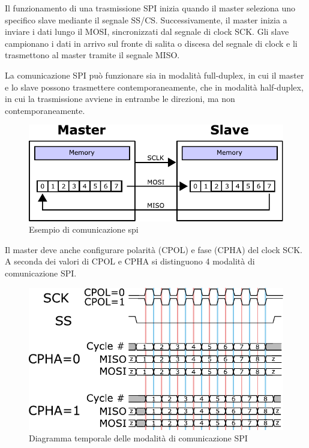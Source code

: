 \documentclass[titlepage]{report}
\begin{document}
			Il funzionamento di una trasmissione SPI inizia quando il master seleziona uno specifico slave mediante il segnale SS/CS. Successivamente, il master inizia a inviare i dati lungo il MOSI, sincronizzati dal segnale di clock SCK. Gli slave campionano i dati in arrivo sul fronte di salita o discesa del segnale di clock e li trasmettono al master tramite il segnale MISO.

			La comunicazione SPI può funzionare sia in modalità full-duplex, in cui il master e lo slave possono trasmettere contemporaneamente, che in modalità half-duplex, in cui la trasmissione avviene in entrambe le direzioni, ma non contemporaneamente.

			\begin{figure}[ht]
				\centering
				\includegraphics[scale=0.5]{./img/SPI_8-bit_circular_transfer.pdf}
				\caption{Esempio di comunicazione spi}
				\label{fig:spi_example_comm}
			\end{figure}

			Il master deve anche configurare polarità (CPOL) e fase (CPHA) del clock SCK. A seconda dei valori di CPOL e CPHA si distinguono 4 modalità di comunicazione SPI.


			\begin{figure}[ht]
				\centering
				\includegraphics[scale=0.75]{./img/SPI_timing_diagram.pdf}
				\caption{Diagramma temporale delle modalità di comunicazione SPI}
				\label{fig:spi_timing}
			\end{figure}
\end{document}
